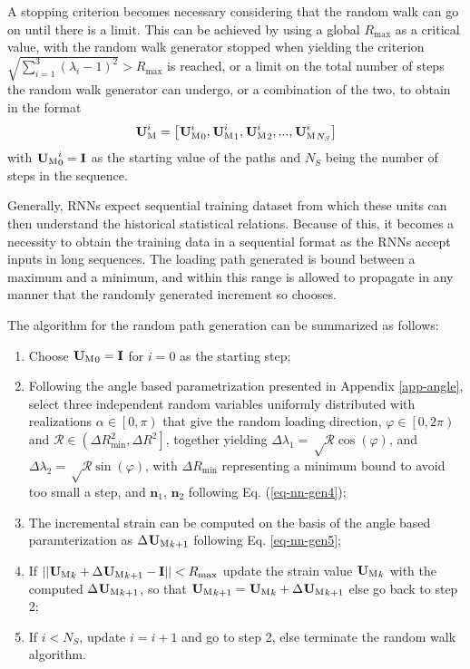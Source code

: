 A stopping criterion becomes necessary considering that the random walk can go on until there is a limit. This can be achieved by using a global $ R_\text{max} $ as a critical value, with the random walk generator stopped when yielding the criterion $ \sqrt{\sum_{i=1}^3\left(\lambda_i-1\right)^2}>R_\text{max} $ is reached, or a limit on the total number of steps the random walk generator can undergo, or a combination of the two, to obtain in the format
\begin{equation}\label{eq-nn-path}
\tgm[]{U}^i=\left[{\tgm[]{U}^i}_0,{\tgm[]{U}^i}_1,{\tgm[]{U}^i}_2,...,{\tgm[]{U}^i}_{N_S}\right]
\end{equation}
with $ {\tgm[]{U}}^i_0 =\textbf{I}$ as the starting value of the paths and $ N_S $ being the number of steps in the sequence.

Generally, RNNs expect sequential training dataset from which these units can then understand the historical statistical relations. Because of this, it becomes a necessity to obtain the training data in a sequential format as the RNNs accept inputs in long sequences. The loading path generated is bound between a maximum and a minimum, and within this range is allowed to propagate in any manner that the randomly generated increment so chooses.

The algorithm for the random path generation can be summarized as follows:
\begin{enumerate}
	\item Choose $ {\tgm[]{U}}_0=\textbf{I} $ for $ i=0 $ as the starting step;
	\item Following the angle based parametrization presented in Appendix \ref{app-angle}, select three independent random variables uniformly distributed with realizations $ \alpha\in\left[0,\pi\right) $ that give the random loading direction, $ \varphi\in\left[0,2\pi\right) $ and $ \mathcal{R}\in\left(\Delta R^2_\text{min},\Delta R^2\right] $, together yielding $ \Delta\lambda_1=\sqrt\mathcal{R}\cos(\varphi) $, and $ \Delta\lambda_2=\sqrt\mathcal{R}\sin(\varphi) $, with $ \Delta R_\text{min} $ representing a minimum bound to avoid too small a step, and $ \textbf{n}_1 $, $ \textbf{n}_2 $ following Eq. (\ref{eq-nn-gen4});
	\item The incremental strain can be computed on the basis of the angle based paramterization as $ \Delta{\tgm[]{U}}_{k+1}$ following Eq. \ref{eq-nn-gen5};
	\item If $ ||{\tgm[]{U}}_k+\Delta{\tgm[]{U}}_{k+1}-\textbf{I}||<R_\text{max} $ update the strain value $ {\tgm[]{U}}_k $ with the computed $ \Delta{\tgm[]{U}}_{k+1} $, so that $ {\tgm[]{U}}_{k+1}={\tgm[]{U}}_k+\Delta{\tgm[]{U}}_{k+1} $ else go back to step 2;
	\item If $ i<N_S $, update $ i=i+1 $ and go to step 2, else terminate the random walk algorithm.
\end{enumerate}

